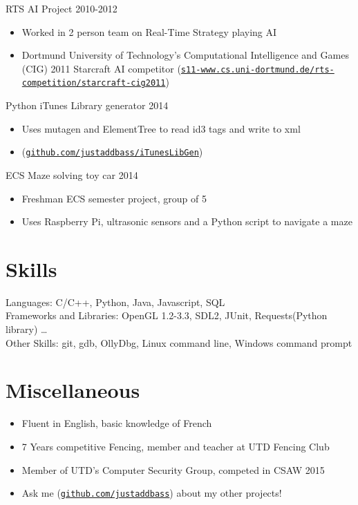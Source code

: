 \documentclass[line,margin]{res}
\begin{document}
\begin{resume}
\vspace{6pt}
RTS AI Project
\hfill 2010-2012
	\begin{itemize} \itemsep -2pt
	\item Worked in 2 person team on Real-Time Strategy playing AI
	\item Dortmund University of Technology’s Computational Intelligence and Games (CIG) 2011 Starcraft AI
        competitor (\href{https://www.s11-www.cs.uni-dortmund.de/rts-competition/starcraft-cig2011}{\texttt{s11-www.cs.uni-dortmund.de/rts-competition/starcraft-cig2011}})
	\end{itemize}

\vspace{6pt}
Python iTunes Library generator
\hfill 2014
	\begin{itemize} \itemsep -2pt
	\item Uses mutagen and ElementTree to read id3 tags and write to xml
	\item (\href{https://github.com/justaddbass/iTunesLibGen}{\texttt{github.com/justaddbass/iTunesLibGen}})
	\end{itemize}

\vspace{6pt}
ECS Maze solving toy car
\hfill 2014
	\begin{itemize} \itemsep -2pt
	\item Freshman ECS semester project, group of 5
	\item Uses Raspberry Pi, ultrasonic sensors and a Python script to navigate a maze
	\end{itemize}

\vspace{8pt}
\section{Skills}
\vspace{12pt}
	Languages: C/C++, Python, Java, Javascript, SQL \\
	Frameworks and Libraries: OpenGL 1.2-3.3, SDL2, JUnit, Requests(Python library) \ldots \\
	Other Skills: git, gdb, OllyDbg, Linux command line, Windows command prompt

\vspace{8pt}
\section{Miscellaneous}
\vspace{22pt}
	\begin{itemize} \itemsep -2pt
	\item Fluent in English, basic knowledge of French
	\item 7 Years competitive Fencing, member and teacher at UTD Fencing Club
	\item Member of UTD's Computer Security Group, competed in CSAW 2015
	\item Ask me (\href{https://github.com/justaddbass}{\texttt{github.com/justaddbass}}) about my other projects!
	\end{itemize}

\end{resume}
\end{document}
